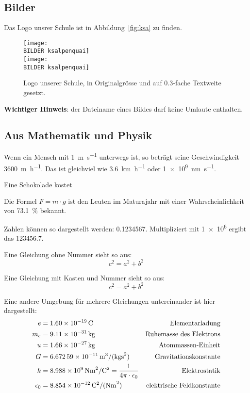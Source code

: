 \subsection*{Bilder}
Das Logo unsrer Schule ist in Abbildung~\vref{fig:ksa} zu finden.
\begin{figure}[htb]
	\centering
		\texttt{[image: \\BILDER ksalpenquai]} \\
		\vspace{1ex}
		\texttt{[image: \\BILDER ksalpenquai]}
 	\caption[Logo unserer Schule]{Logo unserer Schule, in Originalgrösse und auf 0.3-fache Textweite gesetzt.\footnotemark}
  \label{fig:ksa}
\end{figure}

\textbf{Wichtiger Hinweis}: der Dateiname eines Bildes darf keine Umlaute enthalten.

\subsection*{Aus Mathematik und Physik}

Wenn ein Mensch mit \SI{1}{\meter\per\second} unterwegs ist, so beträgt seine Geschwindigkeit \SI{3600}{\meter\per\hour}. 
Das ist gleichviel wie \SI{3.6}{\kilo\meter\per\hour} oder \SI{1e9}{\nano\meter\per\second}.

Eine Schokolade kostet 

Die Formel $F =  m \cdot  g$ ist den Leuten im Maturajahr mit einer Wahrscheinlichkeit von \SI{73.1}{\percent} bekannt. 

Zahlen können so dargestellt werden: \num{0.1234567}. Multipliziert mit \num{1e6} ergibt das \num{123456.7}.

Eine Gleichung ohne Nummer sieht so aus:
\begin{equation*}
c^2 =  a^2 + b^2
\end{equation*}

Eine Gleichung mit Kasten und Nummer sieht so aus:
\begin{equation}
\boxed{
	c^2 =  a^2 + b^2
}
\end{equation}

Eine andere Umgebung für mehrere Gleichungen untereinander ist hier dargestellt:
\begin{align*}
e &= \SI{1.60E-19}{\coulomb} &\text{Elementarladung} \\
m_{e} &=  \SI{9.11E-31}{\kilo\gram} &\text{Ruhemasse des Elektrons}\\
u &=  \SI{1.66e-27}{\kilo\gram} &\text{Atommassen-Einheit} \\
G&= \SI{6.67259E-11}{\meter^3\per(\kilo\gram\second^2)} &\text{Gravitationskonstante} \\
k& = \SI{8.988E9}{\newton\meter^2\per\coulomb^2}= \frac{1}{4 \pi \cdot \epsilon_0}  &\text{Elektrostatik} \\
\epsilon_0&= \SI{8.854E-12}{\coulomb^2\per(\newton\meter^2)} &\text{elektrische Feldkonstante}
\end{align*}

